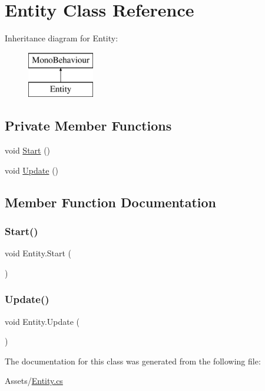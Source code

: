 \hypertarget{class_entity}{}\section{Entity Class Reference}
\label{class_entity}
Inheritance diagram for Entity\+:\begin{figure}[H]
\begin{center}
\leavevmode
\includegraphics[height=2.000000cm]{class_entity}
\end{center}
\end{figure}
\subsection*{Private Member Functions}
\begin{DoxyCompactItemize}
\item 
void \hyperlink{class_entity_af8f28f64bf5e3c10504fda297df36e7a}{Start} ()
\item 
void \hyperlink{class_entity_affb7f61936022527f11a05baaab79b2a}{Update} ()
\end{DoxyCompactItemize}


\subsection{Member Function Documentation}
\mbox{\label{class_entity_af8f28f64bf5e3c10504fda297df36e7a}} 
\subsubsection{\texorpdfstring{Start()}{Start()}}
{\footnotesize\ttfamily void Entity.\+Start (\begin{DoxyParamCaption}{ }\end{DoxyParamCaption})\hspace{0.3cm}{\ttfamily [private]}}

\mbox{\label{class_entity_affb7f61936022527f11a05baaab79b2a}} 
\subsubsection{\texorpdfstring{Update()}{Update()}}
{\footnotesize\ttfamily void Entity.\+Update (\begin{DoxyParamCaption}{ }\end{DoxyParamCaption})\hspace{0.3cm}{\ttfamily [private]}}



The documentation for this class was generated from the following file\+:\begin{DoxyCompactItemize}
\item 
Assets/\hyperlink{_entity_8cs}{Entity.\+cs}\end{DoxyCompactItemize}
